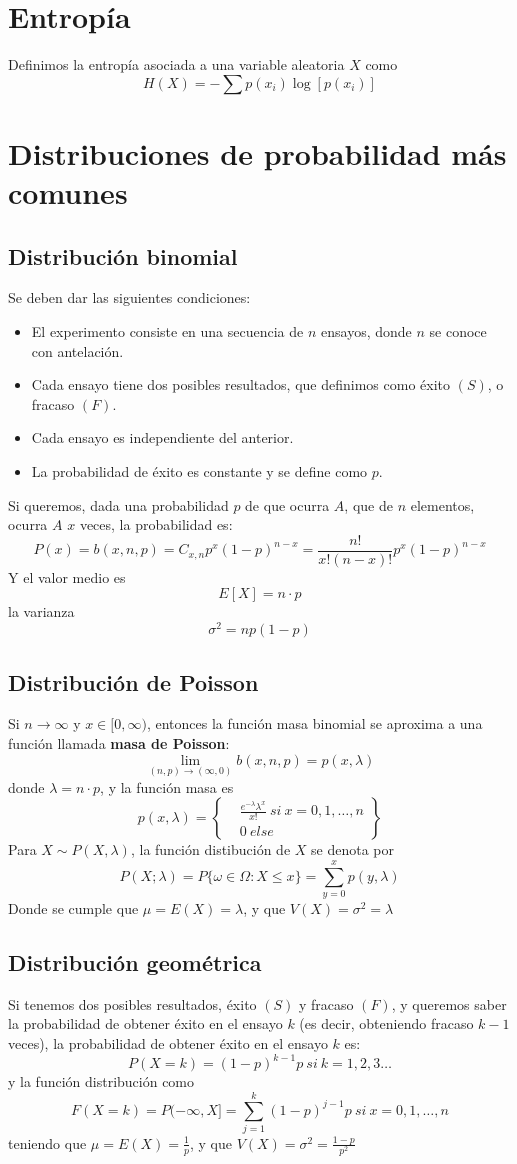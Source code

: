 \documentclass{./Probabilidad.tex}
\begin{document}
\section{Entropía}
Definimos la entropía asociada a una variable aleatoria $X$ como
$$
H(X)= -\sum p(x_{i}) \log[p(x_{i})]
$$
\section{Distribuciones de probabilidad más comunes}
\subsection{Distribución binomial}
Se deben dar las siguientes condiciones:
\begin{itemize}
	\item El experimento consiste en una secuencia de $n$ ensayos, donde $n$ se conoce con antelación.
	\item Cada ensayo tiene dos posibles resultados, que definimos como éxito $(S)$, o fracaso $(F)$.
	\item Cada ensayo es independiente del anterior.
	\item La probabilidad de éxito es constante y se define como $p$. 
\end{itemize}
Si queremos, dada una probabilidad $p$ de que ocurra $A$, que de $n$ elementos, ocurra $A$ $x$ veces, la probabilidad es:     
\[
	P(x) = b(x,n,p) = C_{x,n}p^{x}(1-p)^{n-x} = \frac{n!}{x!(n-x)!}p^{x}(1-p)^{n-x}
\]
Y el valor medio es
\[
	E[X] = n\cdot p
\]
la varianza
\[
	\sigma ^{2}= np(1-p)
\]
\subsection{Distribución de Poisson}
Si $n \to \infty$ y $x \in [0, \infty)$, entonces la función masa binomial se aproxima a una función llamada \textbf{masa de Poisson}:
\[
	\lim_{(n,p) \to (\infty,0)} b(x,n,p)=p(x,\lambda) 
\]
donde $\lambda = n\cdot p$, y la función masa es
\[
	p(x,\lambda) = \left\{
		\begin{matrix}
			&\frac{e^{-\lambda} \lambda^{x}}{x!}~si~x=0,1,\dots ,n\\
			&0~else
	\end{matrix}\right\}
\]
Para $X\sim P(X,\lambda)$, la función distibución de $X$ se denota por
\[
	P(X;\lambda)=P \{ \omega \in \Omega : X \leq x\} = \sum_{y=0}^{x} p(y,\lambda)
\]
Donde se cumple que $\mu = E(X) = \lambda$, y que $V(X) = \sigma ^{2} = \lambda$ 
\subsection{Distribución geométrica}
Si tenemos dos posibles resultados, éxito $(S)$ y fracaso $(F)$, y queremos saber la probabilidad de obtener éxito en el ensayo $k$ (es decir, obteniendo fracaso $k-1$ veces), la probabilidad de obtener éxito en el ensayo $k$ es:     
\[
	P(X=k)=(1-p)^{k-1}p~si~k=1,2,3\dots 
\]
y la función distribución como
\[
	F(X=k)=P(-\infty,X]= \sum_{j=1}^{k} (1-p)^{j-1}p~si~x=0,1,\dots ,n
\]
teniendo que $\mu=E(X)=\frac{1}{p}$, y que $V(X)=\sigma ^{2}= \frac{1-p}{p ^{2}}$
\end{document}
